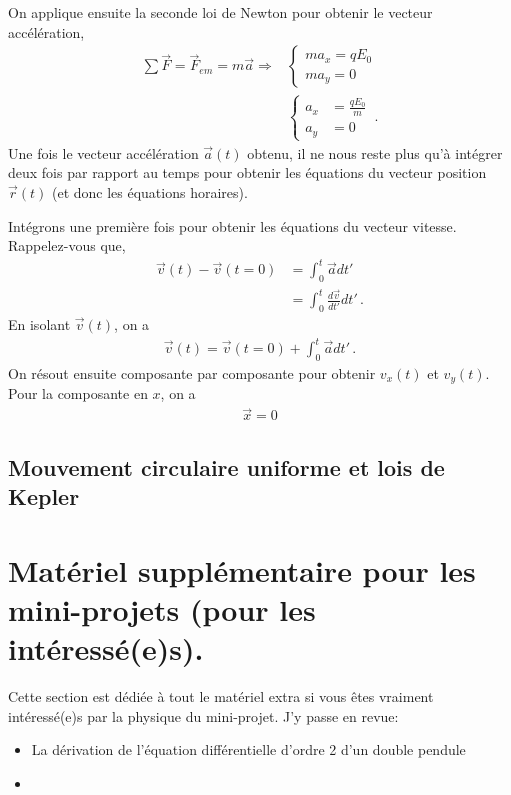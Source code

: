 \documentclass[titlepage]{article}
\theoremstyle{cleanremark}
\begin{document}
On applique ensuite la seconde loi de Newton pour obtenir le vecteur accélération, 
\begin{align}
    \sum \vec{F} = \vec{F}_{em} = m \vec{a} \Longrightarrow &\begin{cases}ma_x = qE_0 \\ ma_y = 0\end{cases}
    \\
    &\begin{cases}
        a_x &=\displaystyle \frac{q E_0}{m}\\
        a_y &= 0
    \end{cases}\, .
\end{align}
Une fois le vecteur accélération $\vec{a}(t)$ obtenu, il ne nous reste plus qu'à intégrer deux fois 
par rapport au temps pour obtenir les équations du vecteur position $\vec{r}(t)$ (et donc les équations horaires).

\noindent Intégrons une première fois pour obtenir les équations du vecteur vitesse. Rappelez-vous que, 
\begin{align}
\vec{v}(t)-\vec{v}(t=0) &= \int_0^{t} \vec{a} dt'
\\
&= \int_0^{t} \frac{d\vec{v}}{dt'} dt'\, . 
\end{align}
En isolant $\vec{v}(t)$, on a 
\begin{align}
\vec{v}(t) = \vec{v}(t=0) + \int_0^{t}\vec{a} dt ' \, .
\end{align}
On résout ensuite composante par composante pour obtenir $v_x(t)$ et $v_y(t)$.
Pour la composante en $x$, on a
\begin{align}
    \vec{x} = 0
\end{align}


\subsection{Mouvement circulaire uniforme et lois de Kepler}

\section{Matériel supplémentaire pour les mini-projets (pour les intéressé(e)s).}
Cette section est dédiée à tout le matériel extra si vous êtes vraiment intéressé(e)s par la physique du mini-projet.
J'y passe en revue:
\begin{itemize}
    \item La dérivation de l'équation différentielle d'ordre 2 d'un double pendule
    \item  
\end{itemize}
\end{document}
